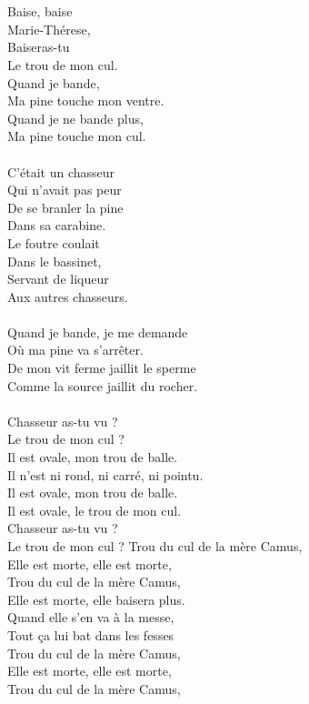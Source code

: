 \\\\Baise, baise 
\\Marie-Thérese,
\\Baiseras-tu 
\\Le trou de mon cul.
\\Quand je bande,
\\Ma pine touche mon ventre.
\\Quand je ne bande plus,
\\Ma pine touche mon cul.
\\\\C'était un chasseur 
\\Qui n'avait pas peur
\\De se branler la pine 
\\Dans sa carabine.
\\Le foutre coulait 
\\Dans le bassinet,
\\Servant de liqueur 
\\Aux autres chasseurs.
\\\\Quand je bande, je me demande
\\Où ma pine va s'arrêter.
\\De mon vit ferme jaillit le sperme
\\Comme la source jaillit du rocher.
\\\\Chasseur as-tu vu ?
\\Le trou de mon cul ?
\\Il est ovale, mon trou de balle.
\\Il n'est ni rond, ni carré, ni pointu.
\\Il est ovale, mon trou de balle.
\\Il est ovale, le trou de mon cul.
\\Chasseur as-tu vu ?
\\Le trou de mon cul ?
\breakpage
Trou du cul de la mère Camus,
\\Elle est morte, elle est morte,
\\Trou du cul de la mère Camus,
\\Elle est morte, elle baisera plus.
\\Quand elle s'en va à la messe,
\\Tout ça lui bat dans les fesses
\\Trou du cul de la mère Camus,
\\Elle est morte, elle est morte,
\\Trou du cul de la mère Camus,
